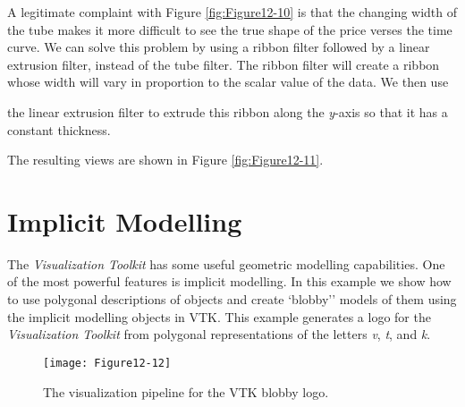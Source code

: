 A legitimate complaint with Figure \ref{fig:Figure12-10} is that the changing
width of the tube makes it more difficult to see the true shape of the
price verses the time curve. We can solve this problem by using a
ribbon filter followed by a linear extrusion filter, instead of the
tube filter. The ribbon filter will create a ribbon whose width will
vary in proportion to the scalar value of the data. We then use

the linear extrusion filter to extrude this ribbon along the \emph{y}-axis
so that it has a constant thickness.

The resulting views are shown in Figure \ref{fig:Figure12-11}.

\section{Implicit Modelling}

The \emph{Visualization Toolkit} has some useful geometric modelling capabilities. One of the most powerful features is implicit modelling. In this example we show how to use polygonal descriptions of objects and create `blobby'' models of them using the implicit modelling objects in VTK. This example generates a logo for the \emph{Visualization Toolkit} from polygonal representations of the letters \emph{v}, \emph{t}, and \emph{k}.

\begin{figure}[!htb]
	\centering
	\texttt{[image: Figure12-12]}
	\caption{The visualization pipeline for the VTK blobby logo.}
	\label{fig:Figure12-12}
\end{figure}

